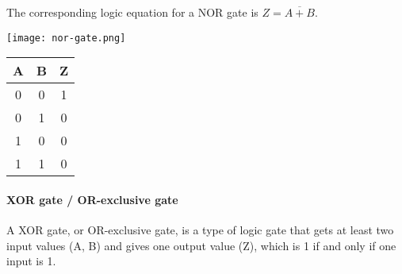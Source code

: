 The corresponding logic equation for a NOR gate is $Z = \overline{A + B}$.

\begin{minipage}{\textwidth}
\vspace{1cm}
\begin{minipage}[c]{0.49\textwidth}
    \centering
    \texttt{[image: nor-gate.png]}
\end{minipage}
\hfill
\begin{minipage}[c]{.49\textwidth}
    \centering
    \begin{tabular}{ |c|c|c| } \hline 
        \textbf{A} & \textbf{B} & \textbf{Z} \\ \hline
        0 & 0 & 1 \\
        0 & 1 & 0 \\
        1 & 0 & 0 \\
        1 & 1 & 0 \\        
        \hline
    \end{tabular}
\end{minipage}
\end{minipage}


\paragraph{XOR gate / OR-exclusive gate}
\begin{definition}
    A XOR gate, or OR-exclusive gate, is a type of logic gate that gets at least two input values (A, B) and gives one output value (Z), which is 1 if and only if one input is 1.
\end{definition}

